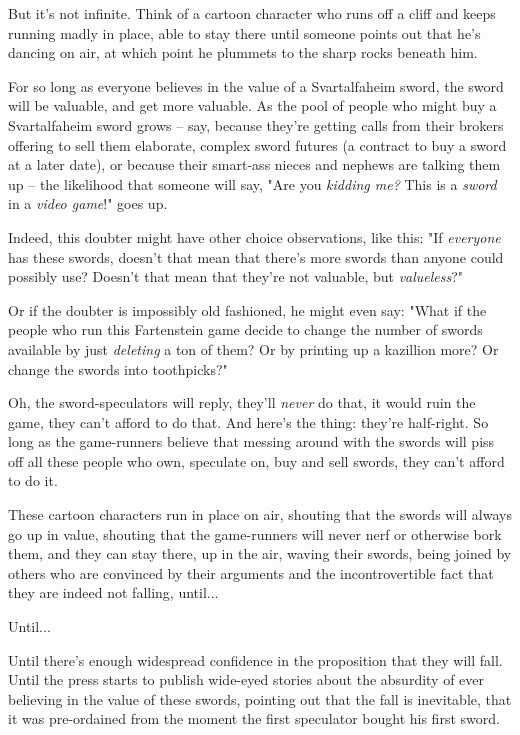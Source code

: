 But it's not infinite. Think of a cartoon character who runs off a
cliff and keeps running madly in place, able to stay there until
someone points out that he's dancing on air, at which point he
plummets to the sharp rocks beneath him.

For so long as everyone believes in the value of a Svartalfaheim
sword, the sword will be valuable, and get more valuable. As the
pool of people who might buy a Svartalfaheim sword grows -- say,
because they're getting calls from their brokers offering to sell
them elaborate, complex sword futures (a contract to buy a sword at
a later date), or because their smart-ass nieces and nephews are
talking them up -- the likelihood that someone will say, "Are you
\emph{kidding me?} This is a \emph{sword} in a \emph{video game}!"
goes up.

Indeed, this doubter might have other choice observations, like
this: "If \emph{everyone} has these swords, doesn't that mean that
there's more swords than anyone could possibly use? Doesn't that
mean that they're not valuable, but \emph{valueless}?"

Or if the doubter is impossibly old fashioned, he might even say:
"What if the people who run this Fartenstein game decide to change
the number of swords available by just \emph{deleting} a ton of
them? Or by printing up a kazillion more? Or change the swords into
toothpicks?"

Oh, the sword-speculators will reply, they'll \emph{never} do that,
it would ruin the game, they can't afford to do that. And here's
the thing: they're half-right. So long as the game-runners believe
that messing around with the swords will piss off all these people
who own, speculate on, buy and sell swords, they can't afford to do
it.

These cartoon characters run in place on air, shouting that the
swords will always go up in value, shouting that the game-runners
will never nerf or otherwise bork them, and they can stay there, up
in the air, waving their swords, being joined by others who are
convinced by their arguments and the incontrovertible fact that
they are indeed not falling, until...

Until...

Until there's enough widespread confidence in the proposition that
they will fall. Until the press starts to publish wide-eyed stories
about the absurdity of ever believing in the value of these swords,
pointing out that the fall is inevitable, that it was pre-ordained
from the moment the first speculator bought his first sword.

